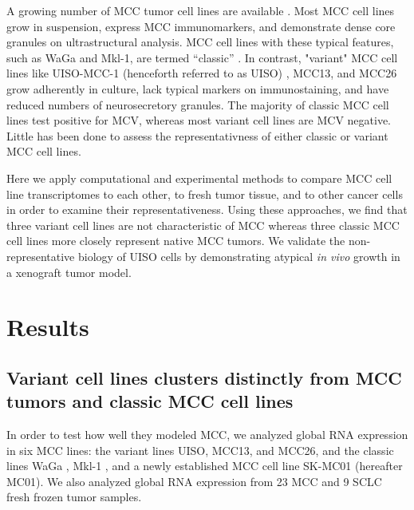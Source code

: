 \documentclass[10pt]{article}
\begin{document}
A growing number of MCC tumor cell lines are available \citep{Krasagakis2001Growth,Leonard1993Characterization,Rosen1987Establishment,Leonard1995Characterisation,Moll1994Establishment,Ronan1993Merkel}.
Most MCC cell lines grow in suspension, express MCC immunomarkers, and demonstrate dense core granules on ultrastructural analysis.
MCC cell lines with these typical features, such as WaGa and Mkl-1, are termed ``classic'' \citep{Ronan1993Merkel,Leonard1993Characterization,VanGele2004Geneexpression}.
In contrast, "variant" MCC cell lines like UISO-MCC-1 (henceforth referred to as UISO) \citep{Ronan1993Merkel}, MCC13, and MCC26 \citep{Leonard1995Characterisation} grow adherently in culture, lack typical markers on immunostaining, and have reduced numbers of neurosecretory granules.
The majority of classic MCC cell lines test positive for MCV, whereas most variant cell lines are MCV negative. 
Little has been done to assess the representativness of either classic or variant MCC cell lines.

Here we apply computational and experimental methods to compare MCC cell line transcriptomes to each other, to fresh tumor tissue, and to other cancer cells in order to examine their representativeness.
Using these approaches, we find that three variant cell lines are not characteristic of MCC whereas three classic MCC cell lines more closely represent native MCC tumors. 
We validate the non-representative biology of UISO cells by demonstrating atypical \emph{in vivo} growth in a xenograft tumor model. 

\section*{Results}

\subsection*{Variant cell lines clusters distinctly from MCC tumors and classic MCC cell lines}
In order to test how well they modeled MCC, we analyzed global RNA expression in six MCC lines: the variant lines UISO, MCC13, and MCC26, and the classic lines WaGa \citep{Houben2010Merkel}, Mkl-1 \citep{Rosen1987Establishment}, and a newly established MCC cell line SK-MC01 (hereafter MC01).
We also analyzed global RNA expression from 23 MCC and 9 SCLC fresh frozen tumor samples.
\end{document}
